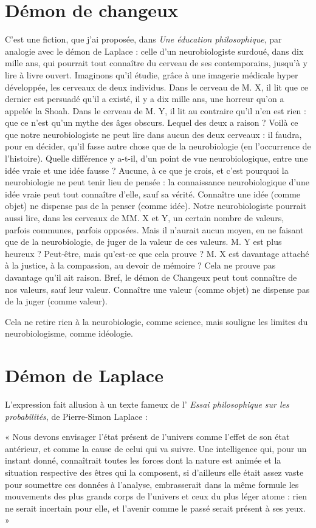 \section{Démon de changeux}
C'est une fiction, que j'ai proposée, dans {\it Une
éducation philosophique}, par analogie avec le
démon de Laplace : celle d’un neurobiologiste surdoué, dans dix mille ans, qui
pourrait tout connaître du cerveau de ses contemporains, jusqu’à y lire à livre
ouvert. Imaginons qu’il étudie, grâce à une imagerie médicale hyper développée,
les cerveaux de deux individus. Dans le cerveau de M. X, il lit que ce
dernier est persuadé qu'il a existé, il y a dix mille ans, une horreur qu’on a
appelée la Shoah. Dans le cerveau de M. Y, il lit au contraire qu’il n’en est rien :
que ce n’est qu’un mythe des âges obscurs. Lequel des deux a raison ? Voilà
ce que notre neurobiologiste ne peut lire dans aucun des deux cerveaux : il
faudra, pour en décider, qu’il fasse autre chose que de la neurobiologie (en
l'occurrence de l’histoire). Quelle différence y a-t-il, d’un point de vue neurobiologique,
entre une idée vraie et une idée fausse ? Aucune, à ce que je crois,
et c’est pourquoi la neurobiologie ne peut tenir lieu de pensée : la connaissance
neurobiologique d’une idée vraie peut tout connaître d’elle, sauf sa vérité.
Connaître une idée (comme objet) ne dispense pas de la penser (comme idée).
Notre neurobiologiste pourrait aussi lire, dans les cerveaux de MM. X et Y,
un certain nombre de valeurs, parfois communes, parfois opposées. Mais il
n'aurait aucun moyen, en ne faisant que de la neurobiologie, de juger de la
valeur de ces valeurs. M. Y est plus heureux ? Peut-être, mais qu'est-ce que cela
prouve ? M. X est davantage attaché à la justice, à la compassion, au devoir de
mémoire ? Cela ne prouve pas davantage qu’il ait raison. Bref, le démon de
Changeux peut tout connaître de nos valeurs, sauf leur valeur. Connaître une
valeur (comme objet) ne dispense pas de la juger (comme valeur).

Cela ne retire rien à la neurobiologie, comme science, mais souligne les
limites du neurobiologisme, comme idéologie.

\section{Démon de Laplace}
L'expression fait allusion à un texte fameux de l’ {\it Essai
philosophique sur les probabilités}, de Pierre-Simon
Laplace :

\vspace{0.5cm}
{\footnotesize
« Nous devons envisager l’état présent de l’univers comme l'effet de son état antérieur,
et comme la cause de celui qui va suivre. Une intelligence qui, pour un instant
donné, connaîtrait toutes les forces dont la nature est animée et la situation respective
des êtres qui la composent, si d’ailleurs elle était assez vaste pour soumettre ces données
à l’analyse, embrasserait dans la même formule les mouvements des plus grands corps
de l’univers et ceux du plus léger atome : rien ne serait incertain pour elle, et l’avenir
comme le passé serait présent à ses yeux. »
}
\vspace{0.5cm}

